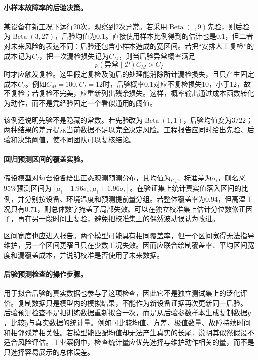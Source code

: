 \paragraph{小样本故障率的后验决策。}
某设备在新工况下运行$20$次，观察到$2$次异常。若采用$\operatorname{Beta}(1,9)$先验，则后验为$\operatorname{Beta}(3,27)$，后验均值为$0.1$。直接使用样本比例得到的估计也是$0.1$，但二者对未来风险的表达不同：后验还包含小样本造成的宽区间。若把“安排人工复检”的成本记为$C_I$，把一次漏检损失记为$C_M$，则当后验异常概率满足
\begin{equation}
 p(\text{异常}\mid\mathcal D)C_M>C_I
\end{equation}
时才应触发复检。这里假定复检及随后的处理能消除所计漏检损失，且只产生固定成本$C_I$。例如$C_M=100,C_I=12$时，后验概率$0.1$对应不复检损失10，小于12，故不复检；若复检不完美，应重新列出残余损失。这样，概率输出通过成本函数转化为动作，而不是凭经验固定一个看似通用的阈值。

该例还说明先验不是隐藏的常数。若先验改为$\operatorname{Beta}(1,1)$，后验均值变为$3/22$；两种结果的差异提示当前数据不足以完全决定风险。工程报告应同时给出先验、后验和决策阈值，使不同团队可以复核结论。

\paragraph{回归预测区间的覆盖实验。}
假设模型对每台设备给出正态观测预测分布，其均值为$\mu_i$、标准差为$\sigma_i$，则名义95\%预测区间为$[\mu_i-1.96\sigma_i,\mu_i+1.96\sigma_i]$。在验证集上统计真实值落入区间的比例，并分别按设备、环境温度和预测提前量分组。若整体覆盖率为$0.94$，但高温工况只有$0.71$，则总体数字掩盖了局部失效。可以在独立校准集上估计分位数修正因子，再在另一段时间上复验，避免把校准集上的偶然波动误认为改进。

区间宽度也应进入报告。两个模型可能具有相同覆盖率，但一个区间宽得无法指导维护，另一个区间更窄且只在少数工况失效。因而应联合绘制覆盖率、平均区间宽度和漏覆盖成本，并说明校准是否使用了未来数据。

\paragraph{后验预测检查的操作步骤。}
用于拟合后验的真实数据也参与了这项检查，因此它不是独立测试集上的泛化评价。复制数据只是模型内的模拟结果，不能作为新设备证据再次更新同一后验。
后验预测检查不是把训练数据重新拟合一次，而是从后验参数样本生成复制数据$\tilde y$，比较$\tilde y$与真实数据的统计量。例如可比较均值、方差、极值数量、故障持续时间和相邻残差相关性。若模型能匹配均值却无法产生真实的长尾，说明其似然假设不适合风险评估。工业案例中，检查统计量应优先选择与维护动作相关的量，而不是只选择容易展示的总体误差。


